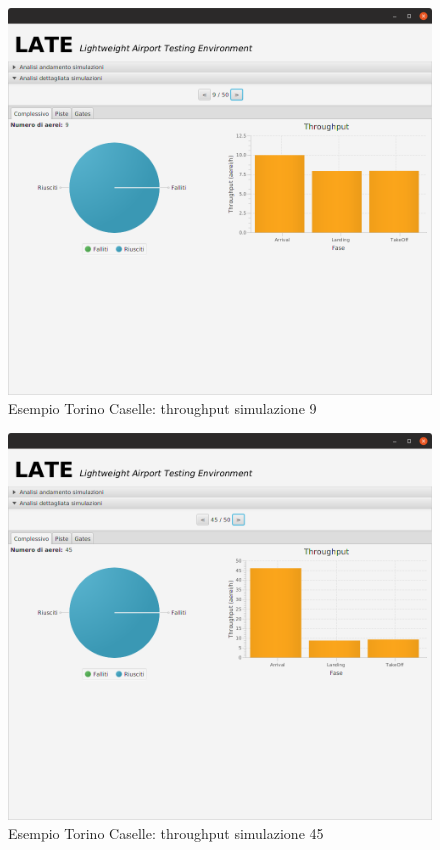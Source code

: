 \documentclass[a4paper, 12pt]{article}
\begin{document}
\begin{figure}[H]
\caption{Esempio Torino Caselle: throughput simulazione 9}
 \label{fig:caselle9TP}
\hfill \includegraphics[height=0.44\textheight]{resources/images/Risultati_03.png}\hspace*{\fill}
\end{figure}

\begin{figure}[H]
\caption{Esempio Torino Caselle: throughput simulazione 45}
 \label{fig:caselle45TP}
\hfill \includegraphics[height=0.44\textheight]{resources/images/Risultati_04.png}\hspace*{\fill}
\end{figure}
\end{document}
